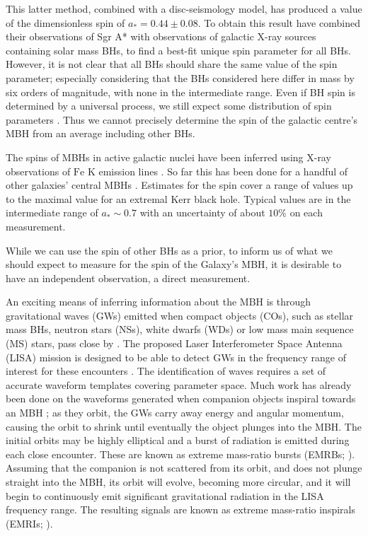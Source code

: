 \documentclass[useAMS,usedcolumn,usegraphicx,usenatbib]{mn2e}
\begin{document}
This latter method, combined with a disc-seismology model, has produced a value of the dimensionless spin of $a_\ast = 0.44 \pm 0.08$. To obtain this result \citet{Kato2010} have combined their observations of Sgr A* with observations of galactic X-ray sources containing solar mass BHs, to find a best-fit unique spin parameter for all BHs. However, it is not clear that all BHs should share the same value of the spin parameter; especially considering that the BHs considered here differ in mass by six orders of magnitude, with none in the intermediate range. Even if BH spin is determined by a universal process, we still expect some distribution of spin parameters \citep{King2008, Berti2008}. Thus we cannot precisely determine the spin of the galactic centre's MBH from an average including other BHs.

The spins of MBHs in active galactic nuclei have been inferred using X-ray observations of $\mathrm{Fe}$ $\mathrm{K}$ emission lines \citep{Miller2007, McClintock2011}. So far this has been done for a handful of other galaxies' central MBHs \citep{Brenneman2006, Miniutti2009, Schmoll2009, delaCallePerez2010, Zoghbi2010, Nardini2011,  Patrick2011}. Estimates for the spin cover a range of values up to the maximal value for an extremal Kerr black hole. Typical values are in the intermediate range of $a_\ast \sim 0.7$ with an uncertainty of about $10\%$ on each measurement.

While we can use the spin of other BHs as a prior, to inform us of what we should expect to measure for the spin of the Galaxy's MBH, it is desirable to have an independent observation, a direct measurement.

An exciting means of inferring information about the MBH is through gravitational waves (GWs) emitted when compact objects (COs), such as stellar mass BHs, neutron stars (NSs), white dwarfs (WDs) or low mass main sequence (MS) stars, pass close by \citep{Sathyaprakash2009}. The proposed Laser Interferometer Space Antenna (LISA) mission is designed to be able to detect GWs in the frequency range of interest for these encounters \citep{Bender1998, Danzmann2003}. The identification of waves requires a set of accurate waveform templates covering parameter space. Much work has already been done on the waveforms generated when companion objects inspiral towards an MBH \citep{Glampedakis2005}; as they orbit, the GWs carry away energy and angular momentum, causing the orbit to shrink until eventually the object plunges into the MBH. The initial orbits may be highly elliptical and a burst of radiation is emitted during each close encounter. These are known as extreme mass-ratio bursts (EMRBs; \citealt{Rubbo2006}). Assuming that the companion is not scattered from its orbit, and does not plunge straight into the MBH, its orbit will evolve, becoming more circular, and it will begin to continuously emit significant gravitational radiation in the LISA frequency range. The resulting signals are known as extreme mass-ratio inspirals (EMRIs; \citealt{Amaro-Seoane2007}).
\end{document}
